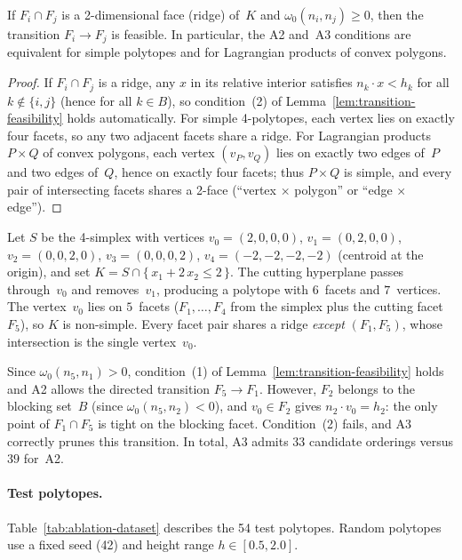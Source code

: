 \begin{corollary}
\label{cor:ridge-sufficiency}
If\/ $F_i \cap F_j$ is a 2-dimensional face (ridge) of~$K$
and $\omega_0(n_i, n_j) \ge 0$, then the transition $F_i \to F_j$
is feasible.
In particular, the A2 and~A3 conditions are equivalent
for simple polytopes and for Lagrangian products of convex polygons.
\end{corollary}

\begin{proof}
If $F_i \cap F_j$ is a ridge, any $x$ in its relative interior satisfies
$n_k \cdot x < h_k$ for all $k \notin \{i,j\}$ (hence for all $k \in B$),
so condition~(2) of Lemma~\ref{lem:transition-feasibility} holds
automatically.
For simple 4-polytopes, each vertex lies on exactly four facets,
so any two adjacent facets share a ridge.
For Lagrangian products $P \times Q$ of convex polygons,
each vertex $(v_P, v_Q)$ lies on exactly two edges of~$P$
and two edges of~$Q$, hence on exactly four facets;
thus $P \times Q$ is simple, and every pair of intersecting facets
shares a 2-face (``vertex $\times$ polygon'' or ``edge $\times$ edge'').
\end{proof}

\begin{example}
\label{ex:a3-prunes}
Let $S$ be the 4-simplex with vertices
$v_0 = (2,0,0,0)$,\; $v_1 = (0,2,0,0)$,\; $v_2 = (0,0,2,0)$,\;
$v_3 = (0,0,0,2)$,\; $v_4 = (-2,-2,-2,-2)$
(centroid at the origin), and set
$K = S \cap \{\, x_1 + 2\, x_2 \le 2 \,\}$.
The cutting hyperplane passes through~$v_0$ and removes~$v_1$,
producing a polytope with $6$~facets and $7$~vertices.
The vertex~$v_0$ lies on $5$~facets ($F_1,\ldots,F_4$ from the simplex
plus the cutting facet~$F_5$), so $K$ is non-simple.
Every facet pair shares a ridge \emph{except} $(F_1, F_5)$,
whose intersection is the single vertex~$v_0$.

Since $\omega_0(n_5, n_1) > 0$, condition~(1) of
Lemma~\ref{lem:transition-feasibility} holds and A2 allows
the directed transition $F_5 \to F_1$.
However, $F_2$ belongs to the blocking set~$B$
(since $\omega_0(n_5, n_2) < 0$), and $v_0 \in F_2$
gives $n_2 \cdot v_0 = h_2$:
the only point of $F_1 \cap F_5$ is tight on the blocking facet.
Condition~(2) fails, and A3 correctly prunes this transition.
In total, A3 admits $33$ candidate orderings versus $39$ for~A2.
\end{example}

\paragraph{Test polytopes.}
Table~\ref{tab:ablation-dataset} describes the 54 test polytopes.
Random polytopes use a fixed seed (42) and height range $h \in [0.5, 2.0]$.

